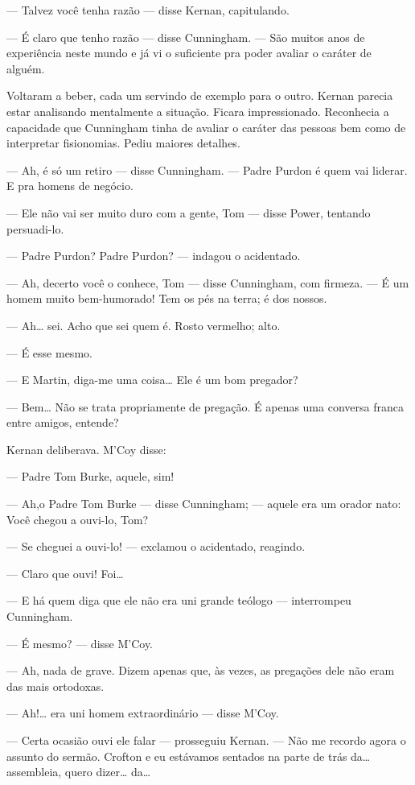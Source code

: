--- Talvez você tenha razão --- disse Kernan, capitulando.

--- É claro que tenho razão --- disse Cunningham. --- São muitos anos
de experiência neste mundo e já vi o suficiente pra poder avaliar o
caráter de alguém.

Voltaram a beber, cada um servindo de exemplo para o outro. Kernan
parecia estar analisando mentalmente a situação. Ficara
impressionado. Reconhecia a capacidade que Cunningham tinha de
avaliar o caráter das pessoas bem como de interpretar fisionomias.
Pediu maiores detalhes.

--- Ah, é só um retiro --- disse Cunningham. --- Padre Purdon é quem
vai liderar. E pra homens de negócio.

--- Ele não vai ser muito duro com a gente, Tom --- disse Power,
tentando persuadi-lo.

--- Padre Purdon? Padre Purdon? --- indagou o acidentado.

--- Ah, decerto você o conhece, Tom --- disse Cunningham, com
firmeza. --- É um homem muito bem-humorado! Tem os pés na terra; é
dos nossos.

--- Ah\ldots{} sei. Acho que sei quem é. Rosto vermelho; alto.

--- É esse mesmo.

--- E Martin, diga-me uma coisa\ldots{} Ele é um bom pregador?

--- Bem\ldots{} Não se trata propriamente de pregação. É apenas uma
conversa franca entre amigos, entende?

Kernan deliberava. M'Coy disse:

--- Padre Tom Burke, aquele, sim!

--- Ah,o Padre Tom Burke --- disse Cunningham; --- aquele era um
orador nato: Você chegou a ouvi-lo, Tom?

--- Se cheguei a ouvi-lo! --- exclamou o acidentado, reagindo.

--- Claro que ouvi! Foi\ldots{}

--- E há quem diga que ele não era uni grande teólogo --- interrompeu
Cunningham.

--- É mesmo? --- disse M'Coy.

--- Ah, nada de grave. Dizem apenas que, às vezes, as pregações dele
não eram das mais ortodoxas.

--- Ah!\ldots{} era uni homem extraordinário --- disse M'Coy.

--- Certa ocasião ouvi ele falar --- prosseguiu Kernan. --- Não me
recordo agora o assunto do sermão. Crofton e eu estávamos sentados
na parte de trás da\ldots{} assembleia, quero dizer\ldots{} da\ldots{}

